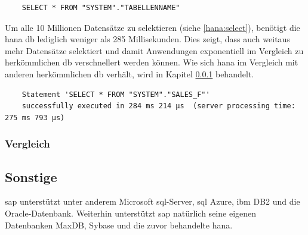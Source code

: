 \begin{lstlisting}
	SELECT * FROM "SYSTEM"."TABELLENNAME"
\end{lstlisting}

Um alle 10 Millionen Datensätze zu selektieren (siehe \ref{hana:select}), benötigt die \gls{hana} \gls{db} lediglich weniger als 285 Millisekunden. Dies zeigt, dass auch weitaus mehr Datensätze selektiert und damit Anwendungen exponentiell im Vergleich zu herkömmlichen \gls{db} verschnellert werden können. Wie sich \gls{hana} im Vergleich mit anderen herkömmlichen \gls{db} verhält, wird in Kapitel \ref{sec:db-hana-vgl} behandelt.

\begin{verbatim}
	Statement 'SELECT * FROM "SYSTEM"."SALES_F"' 
	successfully executed in 284 ms 214 µs  (server processing time: 275 ms 793 µs)
\end{verbatim}

\subsubsection{Vergleich}
\label{sec:db-hana-vgl}

\subsection{Sonstige}
\label{sec:db-sonstige}
\gls{sap} unterstützt unter anderem Microsoft \gls{sql}-Server, \gls{sql} Azure, \gls{ibm} DB2 und die Oracle-Datenbank. Weiterhin unterstützt \gls{sap} natürlich seine eigenen Datenbanken MaxDB, Sybase und die zuvor behandelte \gls{hana}.